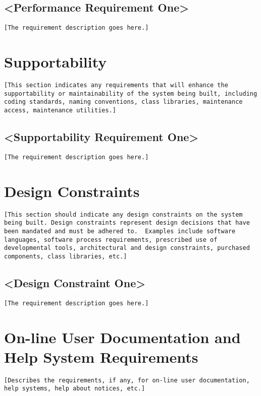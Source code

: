 \documentclass[a4paper,12pt,chapterprefix=false,bibliography=totoc,listof=totoc]{scrreprt}
\begin{document}
\subsection{<Performance Requirement One>}
\begin{verbatim}
[The requirement description goes here.]
\end{verbatim}

\section{Supportability}
\begin{verbatim}
[This section indicates any requirements that will enhance the supportability or maintainability of the system being built, including coding standards, naming conventions, class libraries, maintenance access, maintenance utilities.]
\end{verbatim}

\subsection{<Supportability Requirement One>}
\begin{verbatim}
[The requirement description goes here.]
\end{verbatim}

\section{Design Constraints}
\begin{verbatim}
[This section should indicate any design constraints on the system being built. Design constraints represent design decisions that have been mandated and must be adhered to.  Examples include software languages, software process requirements, prescribed use of developmental tools, architectural and design constraints, purchased components, class libraries, etc.]
\end{verbatim}

\subsection{<Design Constraint One>}
\begin{verbatim}
[The requirement description goes here.]
\end{verbatim}

\section{On-line User Documentation and Help System Requirements}
\begin{verbatim}
[Describes the requirements, if any, for on-line user documentation, help systems, help about notices, etc.]
\end{verbatim}
\end{document}
